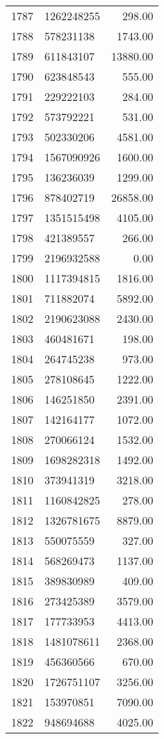 \begin{table}[ht]
\begin{tabular}{rlr}
  1787 & 1262248255 & 298.00 \\ 
  1788 & 578231138 & 1743.00 \\ 
  1789 & 611843107 & 13880.00 \\ 
  1790 & 623848543 & 555.00 \\ 
  1791 & 229222103 & 284.00 \\ 
  1792 & 573792221 & 531.00 \\ 
  1793 & 502330206 & 4581.00 \\ 
  1794 & 1567090926 & 1600.00 \\ 
  1795 & 136236039 & 1299.00 \\ 
  1796 & 878402719 & 26858.00 \\ 
  1797 & 1351515498 & 4105.00 \\ 
  1798 & 421389557 & 266.00 \\ 
  1799 & 2196932588 & 0.00 \\ 
  1800 & 1117394815 & 1816.00 \\ 
  1801 & 711882074 & 5892.00 \\ 
  1802 & 2190623088 & 2430.00 \\ 
  1803 & 460481671 & 198.00 \\ 
  1804 & 264745238 & 973.00 \\ 
  1805 & 278108645 & 1222.00 \\ 
  1806 & 146251850 & 2391.00 \\ 
  1807 & 142164177 & 1072.00 \\ 
  1808 & 270066124 & 1532.00 \\ 
  1809 & 1698282318 & 1492.00 \\ 
  1810 & 373941319 & 3218.00 \\ 
  1811 & 1160842825 & 278.00 \\ 
  1812 & 1326781675 & 8879.00 \\ 
  1813 & 550075559 & 327.00 \\ 
  1814 & 568269473 & 1137.00 \\ 
  1815 & 389830989 & 409.00 \\ 
  1816 & 273425389 & 3579.00 \\ 
  1817 & 177733953 & 4413.00 \\ 
  1818 & 1481078611 & 2368.00 \\ 
  1819 & 456360566 & 670.00 \\ 
  1820 & 1726751107 & 3256.00 \\ 
  1821 & 153970851 & 7090.00 \\ 
  1822 & 948694688 & 4025.00 \\ 

\end{tabular}
\end{table}

